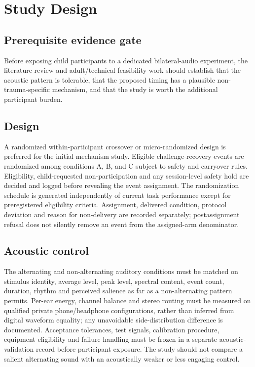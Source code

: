 \section{Study Design}

\subsection{Prerequisite evidence gate}

Before exposing child participants to a dedicated bilateral-audio experiment, the literature review and adult/technical feasibility work should establish that the acoustic pattern is tolerable, that the proposed timing has a plausible non-trauma-specific mechanism, and that the study is worth the additional participant burden.

\subsection{Design}

A randomized within-participant crossover or micro-randomized design is preferred for the initial mechanism study. Eligible challenge-recovery events are randomized among conditions A, B, and C subject to safety and carryover rules. Eligibility, child-requested non-participation and any session-level safety hold are decided and logged before revealing the event assignment. The randomization schedule is generated independently of current task performance except for preregistered eligibility criteria. Assignment, delivered condition, protocol deviation and reason for non-delivery are recorded separately; postassignment refusal does not silently remove an event from the assigned-arm denominator.

\subsection{Acoustic control}

The alternating and non-alternating auditory conditions must be matched on stimulus identity, average level, peak level, spectral content, event count, duration, rhythm and perceived salience as far as a non-alternating pattern permits. Per-ear energy, channel balance and stereo routing must be measured on qualified private phone/headphone configurations, rather than inferred from digital waveform equality; any unavoidable side-distribution difference is documented. Acceptance tolerances, test signals, calibration procedure, equipment eligibility and failure handling must be frozen in a separate acoustic-validation record before participant exposure. The study should not compare a salient alternating sound with an acoustically weaker or less engaging control.

